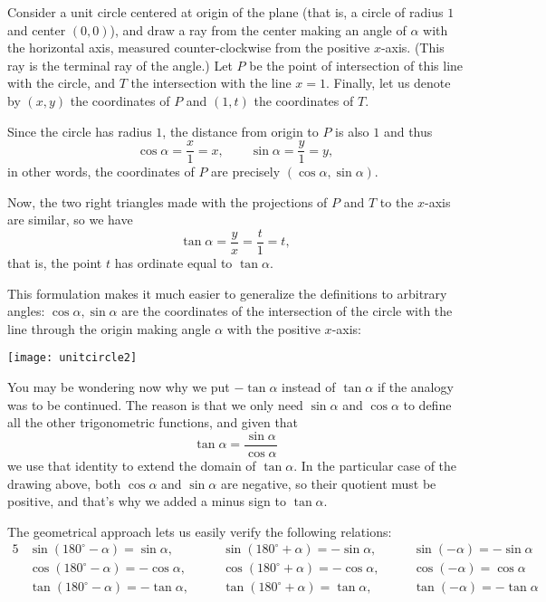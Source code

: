 \documentclass[12pt]{article}
\begin{document}
Consider a unit circle centered at origin of the plane (that is, a circle of radius $1$ and center $(0,0)$), and draw a ray from the center making an angle of $\alpha$ with the horizontal axis, measured counter-clockwise from the positive $x$-axis. (This ray is the terminal ray of the angle.) Let $P$ be the point of intersection of this line with the circle, and $T$ the intersection with the line $x=1$. Finally, let us denote by $(x,y)$ the coordinates of $P$ and $(1,t)$ the coordinates of $T$.

Since the circle has radius $1$, the distance from origin to $P$ is also $1$ and thus
$$\cos\alpha= \frac{x}{1}=x,\qquad \sin\alpha=\frac{y}{1}=y,$$
in other words, the coordinates of $P$ are precisely $(\cos \alpha,\sin\alpha)$.

Now, the two right triangles made with the projections of $P$ and $T$ to the $x$-axis are similar, so we have
$$
\tan \alpha = \frac{y}{x}=\frac{t}{1}=t,
$$
that is, the point $t$ has ordinate equal to $\tan \alpha$.

This formulation makes it much easier to generalize the definitions to arbitrary angles: $\cos\alpha, \sin\alpha$ are the coordinates of the intersection of the circle with the line through the origin making angle $\alpha$ with the positive $x$-axis:
\begin{center}
\texttt{[image: unitcircle2]}
\end{center}

You may be wondering now why we put $-\tan \alpha$ instead of $\tan\alpha$ if the analogy was to be continued. The reason is that we only need $\sin \alpha$ and $\cos \alpha$ to define all the other trigonometric functions, and given that
$$\tan\alpha=\frac{\sin\alpha}{\cos\alpha}$$
we use that identity to extend the domain of $\tan \alpha$. In the particular case of the drawing above, both $\cos \alpha$ and $\sin\alpha$ are negative, so their quotient must be positive, and that's why we added a minus sign to $\tan\alpha$.

The geometrical approach lets us easily verify the following relations:
\begin{alignat*}{5}
&\sin(180^\circ-\alpha)=\sin\alpha, \quad &&\sin(180^\circ+\alpha)= -\sin\alpha,\quad &&\sin(-\alpha)=-\sin\alpha\\
&\cos(180^\circ-\alpha)=-\cos\alpha, \quad &&\cos(180^\circ+\alpha)= -\cos\alpha,\quad &&\cos(-\alpha)=\cos\alpha\\
&\tan(180^\circ-\alpha)=-\tan\alpha, \quad &&\tan(180^\circ+\alpha)= \tan\alpha,\quad &&\tan(-\alpha)=-\tan\alpha
\end{alignat*}
\end{document}
